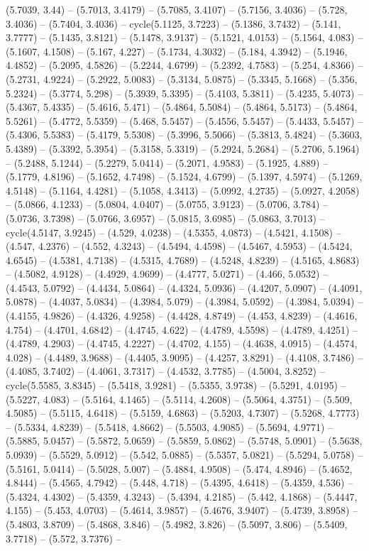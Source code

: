 (5.7039, 3.44) -- (5.7013, 3.4179) -- (5.7085, 3.4107) -- (5.7156, 3.4036) -- (5.728, 3.4036) -- (5.7404, 3.4036) -- cycle(5.1125, 3.7223) -- (5.1386, 3.7432) -- (5.141, 3.7777) -- (5.1435, 3.8121) -- (5.1478, 3.9137) -- (5.1521, 4.0153) -- (5.1564, 4.083) -- (5.1607, 4.1508) -- (5.167, 4.227) -- (5.1734, 4.3032) -- (5.184, 4.3942) -- (5.1946, 4.4852) -- (5.2095, 4.5826) -- (5.2244, 4.6799) -- (5.2392, 4.7583) -- (5.254, 4.8366) -- (5.2731, 4.9224) -- (5.2922, 5.0083) -- (5.3134, 5.0875) -- (5.3345, 5.1668) -- (5.356, 5.2324) -- (5.3774, 5.298) -- (5.3939, 5.3395) -- (5.4103, 5.3811) -- (5.4235, 5.4073) -- (5.4367, 5.4335) -- (5.4616, 5.471) -- (5.4864, 5.5084) -- (5.4864, 5.5173) -- (5.4864, 5.5261) -- (5.4772, 5.5359) -- (5.468, 5.5457) -- (5.4556, 5.5457) -- (5.4433, 5.5457) -- (5.4306, 5.5383) -- (5.4179, 5.5308) -- (5.3996, 5.5066) -- (5.3813, 5.4824) -- (5.3603, 5.4389) -- (5.3392, 5.3954) -- (5.3158, 5.3319) -- (5.2924, 5.2684) -- (5.2706, 5.1964) -- (5.2488, 5.1244) -- (5.2279, 5.0414) -- (5.2071, 4.9583) -- (5.1925, 4.889) -- (5.1779, 4.8196) -- (5.1652, 4.7498) -- (5.1524, 4.6799) -- (5.1397, 4.5974) -- (5.1269, 4.5148) -- (5.1164, 4.4281) -- (5.1058, 4.3413) -- (5.0992, 4.2735) -- (5.0927, 4.2058) -- (5.0866, 4.1233) -- (5.0804, 4.0407) -- (5.0755, 3.9123) -- (5.0706, 3.784) -- (5.0736, 3.7398) -- (5.0766, 3.6957) -- (5.0815, 3.6985) -- (5.0863, 3.7013) -- cycle(4.5147, 3.9245) -- (4.529, 4.0238) -- (4.5355, 4.0873) -- (4.5421, 4.1508) -- (4.547, 4.2376) -- (4.552, 4.3243) -- (4.5494, 4.4598) -- (4.5467, 4.5953) -- (4.5424, 4.6545) -- (4.5381, 4.7138) -- (4.5315, 4.7689) -- (4.5248, 4.8239) -- (4.5165, 4.8683) -- (4.5082, 4.9128) -- (4.4929, 4.9699) -- (4.4777, 5.0271) -- (4.466, 5.0532) -- (4.4543, 5.0792) -- (4.4434, 5.0864) -- (4.4324, 5.0936) -- (4.4207, 5.0907) -- (4.4091, 5.0878) -- (4.4037, 5.0834) -- (4.3984, 5.079) -- (4.3984, 5.0592) -- (4.3984, 5.0394) -- (4.4155, 4.9826) -- (4.4326, 4.9258) -- (4.4428, 4.8749) -- (4.453, 4.8239) -- (4.4616, 4.754) -- (4.4701, 4.6842) -- (4.4745, 4.622) -- (4.4789, 4.5598) -- (4.4789, 4.4251) -- (4.4789, 4.2903) -- (4.4745, 4.2227) -- (4.4702, 4.155) -- (4.4638, 4.0915) -- (4.4574, 4.028) -- (4.4489, 3.9688) -- (4.4405, 3.9095) -- (4.4257, 3.8291) -- (4.4108, 3.7486) -- (4.4085, 3.7402) -- (4.4061, 3.7317) -- (4.4532, 3.7785) -- (4.5004, 3.8252) -- cycle(5.5585, 3.8345) -- (5.5418, 3.9281) -- (5.5355, 3.9738) -- (5.5291, 4.0195) -- (5.5227, 4.083) -- (5.5164, 4.1465) -- (5.5114, 4.2608) -- (5.5064, 4.3751) -- (5.509, 4.5085) -- (5.5115, 4.6418) -- (5.5159, 4.6863) -- (5.5203, 4.7307) -- (5.5268, 4.7773) -- (5.5334, 4.8239) -- (5.5418, 4.8662) -- (5.5503, 4.9085) -- (5.5694, 4.9771) -- (5.5885, 5.0457) -- (5.5872, 5.0659) -- (5.5859, 5.0862) -- (5.5748, 5.0901) -- (5.5638, 5.0939) -- (5.5529, 5.0912) -- (5.542, 5.0885) -- (5.5357, 5.0821) -- (5.5294, 5.0758) -- (5.5161, 5.0414) -- (5.5028, 5.007) -- (5.4884, 4.9508) -- (5.474, 4.8946) -- (5.4652, 4.8444) -- (5.4565, 4.7942) -- (5.448, 4.718) -- (5.4395, 4.6418) -- (5.4359, 4.536) -- (5.4324, 4.4302) -- (5.4359, 4.3243) -- (5.4394, 4.2185) -- (5.442, 4.1868) -- (5.4447, 4.155) -- (5.453, 4.0703) -- (5.4614, 3.9857) -- (5.4676, 3.9407) -- (5.4739, 3.8958) -- (5.4803, 3.8709) -- (5.4868, 3.846) -- (5.4982, 3.826) -- (5.5097, 3.806) -- (5.5409, 3.7718) -- (5.572, 3.7376) -- 